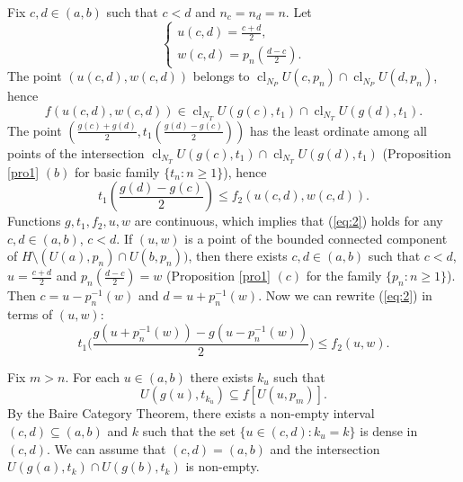\documentclass[a4paper,12pt,leqno]{amsart}
\newcommand{\cl}{\operatorname{cl}}
\theoremstyle{definition}
\renewcommand{\geq}{\geqslant}
\renewcommand{\leq}{\leqslant}
\begin{document}
  Fix $c,d\in (a,b)$ such that $c<d$ and $n_c=n_d=n$.
  Let
  \begin{equation}
    \label{eq:1}
    \textstyle
    \begin{cases}
    u(c,d)=\frac{c+d}2,\\
    w(c,d)=p_n(\frac{d-c}2).  
    \end{cases}
  \end{equation}
The point $(u(c,d),w(c,d))$ belongs to $\cl_{N_P} U(c,p_n)\cap \cl_{N_P}U(d,p_n)$, hence
 $$f(u(c,d),w(c,d))\in \cl_{N_T}U(g(c),t_1)\cap \cl_{N_T}U(g(d),t_1).$$
 The point $\textstyle (\frac{g(c)+g(d)}2,t_1(\frac{g(d)-g(c)}2))$
has the least ordinate among all points of the intersection $\cl_{N_T}U(g(c),t_1)\cap \cl_{N_T}U(g(d),t_1)$ (Proposition \ref{pro1} $(b)$ for basic family $\{t_n\colon n\geq 1\}$), hence
  \begin{equation}
    \label{eq:2}
    \textstyle t_1(\frac{g(d)-g(c)}2)\leq f_2(u(c,d),w(c,d)).
  \end{equation}
  Functions $g,t_1,f_2,u,w$ are continuous, which implies that (\ref{eq:2}) holds for any $c,d\in(a,b)$, $c<d$.
  If $(u,w)$ is a point of the bounded connected component of $H\setminus(U(a),p_n)\cap U(b,p_n))$, then there exists $c,d\in (a,b)$ such that $c<d$, $u=\frac{c+d}2$ and $p_n(\frac{d-c}2)=w$ (Proposition \ref{pro1} $(c)$ for the family $\{p_n\colon n\geq 1\}$).
  Then  $c=u-p_n^{-1}(w)$ and $d=u+p_n^{-1}(w)$.
  Now we can rewrite (\ref{eq:2}) in terms of $(u,w)$:
  \begin{equation}
    \label{eq:3}
 t_1\bigg(\frac{g(u+p_n^{-1}(w))-g(u-p_n^{-1}(w))}2\bigg)\leq f_2(u,w).
\end{equation}

Fix $m>n$.
For each $u\in(a,b)$ there exists $k_u$ such that 
  $$U(g(u),t_{k_u})\subseteq f[U(u,p_m)].$$
By the Baire Category Theorem, there exists a non-empty interval $(c,d)\subseteq (a,b)$ and $k$ such that the set $\{u\in (c,d)\colon k_u=k\}$ is dense in $(c,d)$.
  We can assume that $(c,d)=(a,b)$ and the intersection $U(g(a),t_k)\cap U(g(b),t_k)$ is non-empty.
  
\end{document}
